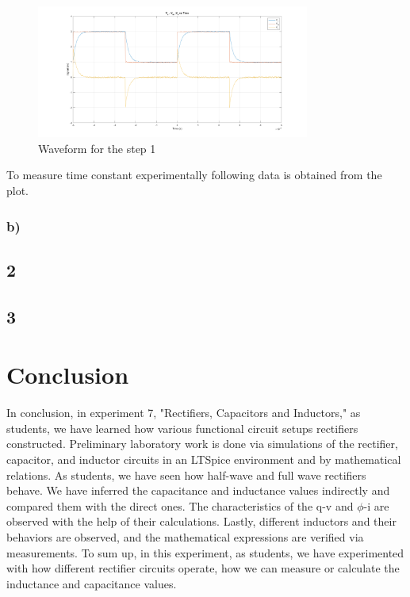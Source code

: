 \documentclass[letterpaper,12pt]{article}
\begin{document}
\begin{figure}[H]
	\centering
   \includegraphics[width=0.8\textwidth]{1a.png}
   \caption{Waveform for the step 1}
\end{figure} 

To measure time constant experimentally following data is obtained from the plot.

\subsubsection{b)}

\subsection{2}

\subsection{3}


\section{Conclusion}

In conclusion, in experiment 7, "Rectifiers, Capacitors and Inductors," as students, we have learned how various functional circuit setups rectifiers constructed. Preliminary laboratory work is done via simulations of the rectifier, capacitor, and inductor circuits in an LTSpice environment and by mathematical relations. As students, we have seen how half-wave and full wave rectifiers behave. We have inferred the capacitance and inductance values indirectly and compared them with the direct ones. The characteristics of the q-v and \(\phi\)-i are observed with the help of their calculations. Lastly, different inductors and their behaviors are observed, and the mathematical expressions are verified via measurements. To sum up, in this experiment, as students, we have experimented with how different rectifier circuits operate, how we can measure or calculate the inductance and capacitance values. 
\end{document}
